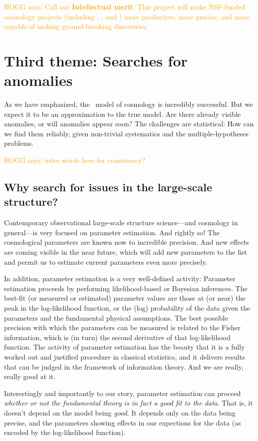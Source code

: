 \documentclass[12pt, fullpage, letterpaper]{article}
\newcommand{\HOGG}[1]{\textcolor{orange}{HOGG says: #1}}
\begin{document}
\HOGG{Call out \textbf{Intellectual merit}.
This project will make NSF-funded cosmology projects (including
\SDSSIV, \DESI, and \LSST) more productive, more precise, and more
capable of making ground-breaking discoveries.}

\section{Third theme: Searches for anomalies}

As we have emphasized, the \LCDM\ model of cosmology is incredibly successful.
But we expect it to be an approximation to the true model.
Are there already visible anomalies, or will anomalies appear soon?
The challenges are statistical: How can we find them reliably, given
non-trivial systematics and the multiple-hypotheses problems.

\HOGG{intro words here for consistency?}

\subsection{Why search for issues in the large-scale structure?}

Contemporary observational large-scale structure science---and
cosmology in general---is very focused on parameter estimation.
And rightly so!
The cosmological parameters are known now to incredible precision.
And new effects are coming visible in the near future, which will add
new parameters to the list and permit us to estimate current
parameters even more precisely.

In addition, parameter estimation is a very well-defined activity:
Parameter estimation proceeds by performing likelihood-based or
Bayesian inferences.
The best-fit (or measured or estimated) parameter values are those at
(or near) the peak in the log-likelihood function, or the (log)
probability of the data given the parameters and the fundamental
physical assumptions.
The best possible precision with which the parameters can be measured
is related to the Fisher information, which is (in turn) the second
derivative of that log-likelihood function.
The activity of parameter estimation has the beauty that it is a fully
worked out and justified procedure in classical statistics, and it
delivers results that can be judged in the framework of information
theory.
And we are really, really good at it.

Interestingly and importantly to our story,
parameter estimation can proceed \emph{whether or not the fundamental theory
is in fact a good fit to the data}.
That is, it doesn't depend on the model being \emph{good}.
It depends only on the data being precise, and the parameters showing
effects in our expections for the data (as encoded by the log-likelihood function).
\end{document}
